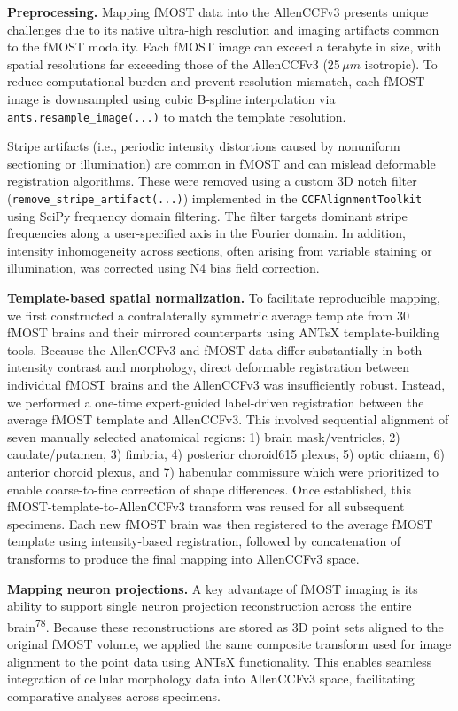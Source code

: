 \documentclass[
  12pt,
]{article}
\begin{document}
\textbf{Preprocessing.} Mapping fMOST data into the AllenCCFv3 presents
unique challenges due to its native ultra-high resolution and imaging
artifacts common to the fMOST modality. Each fMOST image can exceed a
terabyte in size, with spatial resolutions far exceeding those of the
AllenCCFv3 (25\,\(\mu m\) isotropic). To reduce computational burden and
prevent resolution mismatch, each fMOST image is downsampled using cubic
B-spline interpolation via \texttt{ants.resample\_image(...)} to match
the template resolution.

Stripe artifacts (i.e., periodic intensity distortions caused by
nonuniform sectioning or illumination) are common in fMOST and can
mislead deformable registration algorithms. These were removed using a
custom 3D notch filter (\texttt{remove\_stripe\_artifact(...)})
implemented in the \texttt{CCFAlignmentToolkit} using SciPy frequency
domain filtering. The filter targets dominant stripe frequencies along a
user-specified axis in the Fourier domain. In addition, intensity
inhomogeneity across sections, often arising from variable staining or
illumination, was corrected using N4 bias field correction.

\textbf{Template-based spatial normalization.} To facilitate
reproducible mapping, we first constructed a contralaterally symmetric
average template from 30 fMOST brains and their mirrored counterparts
using ANTsX template-building tools. Because the AllenCCFv3 and fMOST
data differ substantially in both intensity contrast and morphology,
direct deformable registration between individual fMOST brains and the
AllenCCFv3 was insufficiently robust. Instead, we performed a one-time
expert-guided label-driven registration between the average fMOST
template and AllenCCFv3. This involved sequential alignment of seven
manually selected anatomical regions: 1) brain mask/ventricles, 2)
caudate/putamen, 3) fimbria, 4) posterior choroid615 plexus, 5) optic
chiasm, 6) anterior choroid plexus, and 7) habenular commissure which
were prioritized to enable coarse-to-fine correction of shape
differences. Once established, this fMOST-template-to-AllenCCFv3
transform was reused for all subsequent specimens. Each new fMOST brain
was then registered to the average fMOST template using intensity-based
registration, followed by concatenation of transforms to produce the
final mapping into AllenCCFv3 space.

\textbf{Mapping neuron projections.} A key advantage of fMOST imaging is
its ability to support single neuron projection reconstruction across
the entire brain\textsuperscript{78}. Because these reconstructions are
stored as 3D point sets aligned to the original fMOST volume, we applied
the same composite transform used for image alignment to the point data
using ANTsX functionality. This enables seamless integration of cellular
morphology data into AllenCCFv3 space, facilitating comparative analyses
across specimens.
\end{document}
